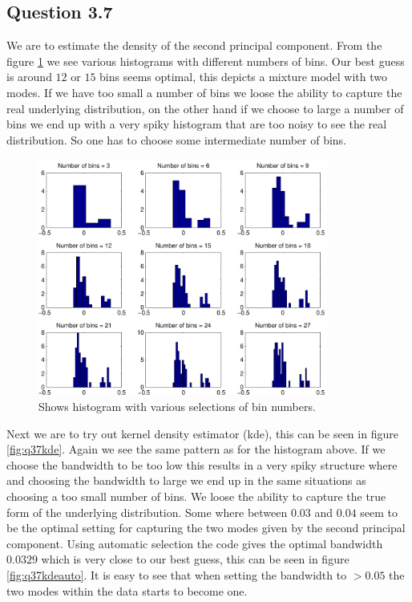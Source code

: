 \subsection*{Question 3.7}
We are to estimate the density of the second principal component. From
the figure \ref{fig:q37histograms} we see various histograms with
different numbers of bins. Our best guess is around $12$ or $15$ bins
seems optimal, this depicts a mixture model with two modes. If we have
too small a number of bins we loose the ability to capture the real
underlying distribution, on the other hand if we choose to large a
number of bins we end up with a very spiky histogram that are too
noisy to see the real distribution. So one has to choose some
intermediate number of bins.

\begin{figure}[!htbp]
  \centering
  \includegraphics[width=0.85\textwidth]{./images/q37histograms}
  \caption{Shows histogram with various selections of bin numbers.}
  \label{fig:q37histograms}
\end{figure}

Next we are to try out kernel density estimator (kde), this can be
seen in figure \ref{fig:q37kde}. Again we see the same pattern as for
the histogram above. If we choose the bandwidth to be too low this
results in a very spiky structure where and choosing the bandwidth to
large we end up in the same situations as choosing a too small number
of bins. We loose the ability to capture the true form of the
underlying distribution. Some where between $0.03$ and $0.04$ seem to
be the optimal setting for capturing the two modes given by the second
principal component. Using automatic selection the code gives the
optimal bandwidth $0.0329$ which is very close to our best guess, this
can be seen in figure \ref{fig:q37kdeauto}. It is easy to see that
when setting the bandwidth to $>0.05$ the two modes within the data
starts to become one.

